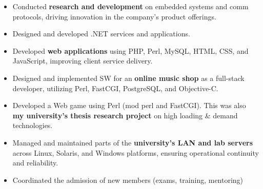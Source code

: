 \documentclass[10pt,a4paper]{altacv}
\begin{document}
\vfil \break

{}

\begin{itemize}
	\item Conducted \textbf{research and development} on embedded systems and comm protocols, driving innovation in the company’s product offerings.
	\item Designed and developed .NET services and applications.
\end{itemize}

\divider

\begin{itemize}
	\item Developed \textbf{web applications} using PHP, Perl, MySQL, HTML, CSS, and JavaScript, improving client service delivery.
\end{itemize}

\divider

\begin{itemize}
	\item Designed and implemented SW for an \textbf{online music shop} as a full-stack developer, utilizing Perl, FastCGI, PostgreSQL, and Objective-C.
\end{itemize}

\divider

\begin{itemize}
	\item Developed a Web game using Perl (mod perl and FastCGI). This was also \textbf{my university's thesis research project} on high loading \& demand technologies.
\end{itemize}

\divider

\begin{itemize}
	\item Managed and maintained parts of the \textbf{university’s LAN and lab servers} across Linux, Solaris, and Windows platforms, ensuring operational continuity and reliability.
	\item Coordinated the admission of new members (exams, training, mentoring)
\end{itemize}
\end{document}
